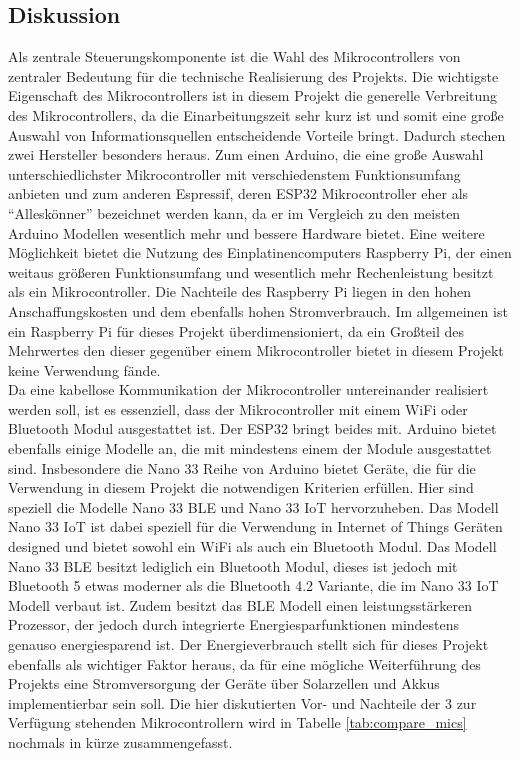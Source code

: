     \subsection{Diskussion}
        Als zentrale Steuerungskomponente ist die Wahl des Mikrocontrollers von zentraler Bedeutung für die technische Realisierung des Projekts. Die wichtigste Eigenschaft des Mikrocontrollers ist in diesem Projekt die generelle Verbreitung des Mikrocontrollers, da die Einarbeitungszeit sehr kurz ist und somit eine große Auswahl von Informationsquellen entscheidende Vorteile bringt. Dadurch stechen zwei Hersteller besonders heraus. Zum einen Arduino, die eine große Auswahl unterschiedlichster Mikrocontroller mit verschiedenstem Funktionsumfang anbieten und zum anderen Espressif, deren ESP32 Mikrocontroller eher als \enquote{Alleskönner} bezeichnet werden kann, da er im Vergleich zu den meisten Arduino Modellen wesentlich mehr und bessere Hardware bietet.
        Eine weitere Möglichkeit bietet die Nutzung des Einplatinencomputers Raspberry Pi, der einen weitaus größeren Funktionsumfang und wesentlich mehr Rechenleistung besitzt als ein Mikrocontroller. Die Nachteile des Raspberry Pi liegen in den hohen Anschaffungskosten und dem ebenfalls hohen Stromverbrauch. Im allgemeinen ist ein Raspberry Pi für dieses Projekt überdimensioniert, da ein Großteil des Mehrwertes den dieser gegenüber einem Mikrocontroller bietet in diesem Projekt keine Verwendung fände.\\
        
        Da eine kabellose Kommunikation der Mikrocontroller untereinander realisiert werden soll, ist es essenziell, dass der Mikrocontroller mit einem WiFi oder Bluetooth Modul ausgestattet ist. Der ESP32 bringt beides mit. Arduino bietet ebenfalls einige Modelle an, die mit mindestens einem der Module ausgestattet sind. Insbesondere die Nano 33 Reihe von Arduino bietet Geräte, die für die Verwendung in diesem Projekt die notwendigen Kriterien erfüllen. Hier sind speziell die Modelle Nano 33 BLE und Nano 33 IoT hervorzuheben. Das Modell Nano 33 IoT ist dabei speziell für die Verwendung in Internet of Things Geräten designed und bietet sowohl ein WiFi als auch ein Bluetooth Modul. Das Modell Nano 33 BLE besitzt lediglich ein Bluetooth Modul, dieses ist jedoch mit Bluetooth 5 etwas moderner als die Bluetooth 4.2 Variante, die im Nano 33 IoT Modell verbaut ist. Zudem besitzt das BLE Modell einen leistungsstärkeren Prozessor, der jedoch durch integrierte Energiesparfunktionen mindestens genauso energiesparend ist. Der Energieverbrauch stellt sich für dieses Projekt ebenfalls als wichtiger Faktor heraus, da für eine mögliche Weiterführung des Projekts eine Stromversorgung der Geräte über Solarzellen und Akkus implementierbar sein soll. Die hier diskutierten Vor- und Nachteile der 3 zur Verfügung stehenden Mikrocontrollern wird in Tabelle \ref{tab:compare_mics} nochmals in kürze zusammengefasst.

